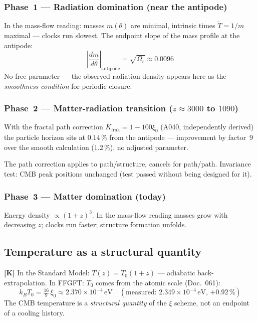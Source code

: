 \subsubsection{Phase~1 --- Radiation domination (near the antipode)}

In the mass-flow reading: masses $m(\theta)$ are minimal, intrinsic
times $\tilde{T} = 1/m$ maximal --- clocks run slowest. The endpoint
slope of the mass profile at the antipode:
\[
  \left|\frac{dm}{d\theta}\right|_\text{antipode}
  = \sqrt{\Omega_r} \approx 0{.}0096
\]
No free parameter --- the observed radiation density appears here as
the \emph{smoothness condition} for periodic closure.

\subsubsection{Phase~2 --- Matter-radiation transition ($z \approx 3000$ to $1090$)}

With the fractal path correction $K_\text{frak} = 1-100\xi_0$ (A040,
independently derived) the particle horizon sits at $0{.}14\,\%$ from
the antipode --- improvement by factor~9 over the smooth calculation
($1{.}2\,\%$), no adjusted parameter.

The path correction applies to path/structure, cancels for path/path.
Invariance test: CMB peak positions unchanged (test passed without being
designed for it).

\subsubsection{Phase~3 --- Matter domination (today)}

Energy density $\propto (1+z)^3$. In the mass-flow reading masses
grow with decreasing $z$; clocks run faster; structure formation
unfolds.

\subsection{Temperature as a structural quantity}

\textbf{[K]} In the Standard Model: $T(z) = T_0(1+z)$ --- adiabatic
back-extrapolation. In FFGFT: $T_0$ comes from the atomic scale
(Doc.~061):
\[
  k_B T_0 = \tfrac{16}{9}\,\xi_0 \approx 2{.}370\times10^{-4}\,\text{eV}
  \quad(\text{measured: }2{.}349\times10^{-4}\,\text{eV, }{+0{.}92\,\%})
\]
The CMB temperature is a \emph{structural quantity} of the $\xi$ scheme,
not an endpoint of a cooling history.

